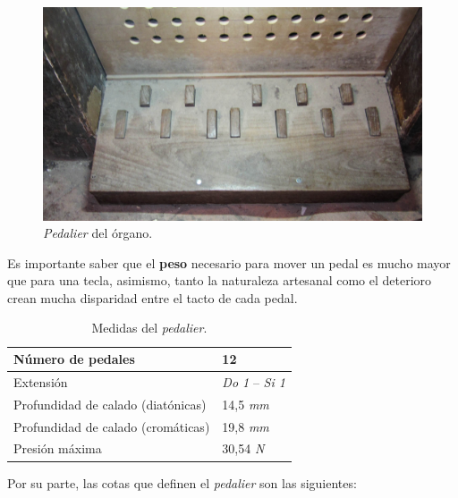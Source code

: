 \begin{figure}[H]
	\noindent \begin{centering}
		\includegraphics[width=\linewidth*3/4]{capitulo3/pedalier}
		\par\end{centering}
	\smallskip
	\caption{\label{fig:pedalier} \textit{Pedalier} del órgano.}
\end{figure} 

\smallskip

Es importante saber que el \textbf{peso} necesario para mover un pedal es mucho mayor que para una tecla, asimismo, tanto la naturaleza artesanal como el deterioro crean mucha disparidad entre el tacto de cada pedal.

\smallskip

\begin{table}[H]
	\begin{center}
		\begin{tabular}{|l|l|}
			\hline Número de pedales & 12 \\ 
			\hline Extensión & \textit{Do 1} -- \textit{Si 1} \\ 
			\hline Profundidad de calado (diatónicas) & 14,5 \textit{mm} \\ 
			\hline Profundidad de calado (cromáticas) & 19,8 \textit{mm} \\
			\hline Presión máxima & 30,54 \textit{N} \\
			\hline 
		\end{tabular}
		\smallskip
		\caption{\label{tab:pedalier} Medidas del \textit{pedalier}.}
	\end{center}
\end{table}

\smallskip

Por su parte, las cotas que definen el \textit{pedalier} son las siguientes:

